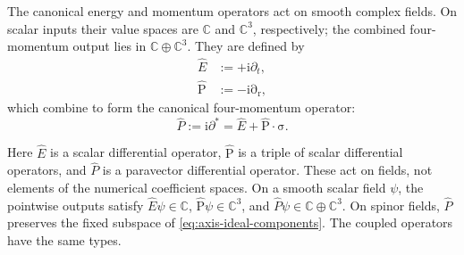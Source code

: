 \documentclass[11pt]{article}
\newcommand{\pv}[1]{{#1}}
\newcommand{\pvGreek}[1]{{#1}}
\newcommand{\vstyle}[1]{{\bm{\mathrm{#1}}}}
\newcommand{\pP}{\pv{P}}
\newcommand{\pvpartial}{\pvGreek{\partial}}
\numberwithin{equation}{section}
\newcommand{\C}{\mathbb{C}}
\newcommand{\ii}{\mathrm{i}}
\newcommand{\dotprod}{\cdot}
\newcommand{\bsig}{\vstyle{\sigma}}
\newcommand{\br}{\vstyle{r}}
\newcommand{\bp}{\vstyle{P}}
\newcommand{\hE}{\hat E}
\newcommand{\hbp}{\hat{\bp}}
\newcommand{\hP}{{\hat{\pP}}}
\newcommand{\pdr}{\vstyle{\partial}_{\br}}
\begin{document}
The canonical energy and momentum operators act on smooth complex fields.
On scalar inputs their value spaces are $\C$ and $\C^3$, respectively;
the combined four-momentum output lies in $\C\oplus\C^3$. They are defined by
\begin{equation}
 \begin{aligned}
 \hE&:=+\ii\partial_t,\\
 \hbp&:=-\ii\pdr,
 \end{aligned}
 \label{eq:canonical-operators}
\end{equation}
which combine to form the canonical four-momentum operator:
\begin{equation}
 \hP:=\ii\pvpartial^*=\hE+\hbp\dotprod\bsig.
 \label{eq:canonical-paravector}
\end{equation}

Here $\hE$ is a scalar differential operator, $\hbp$ is a triple of
scalar differential operators, and $\hP$ is a paravector differential
operator. These act on fields, not elements of the numerical coefficient
spaces. On a smooth scalar field $\psi$, the pointwise outputs satisfy
$\hE\psi\in\C$, $\hbp\psi\in\C^3$, and
$\hP\psi\in\C\oplus\C^3$.
On spinor fields, $\hP$ preserves the fixed subspace of
\eqref{eq:axis-ideal-components}. The coupled operators have the same types.
\end{document}
